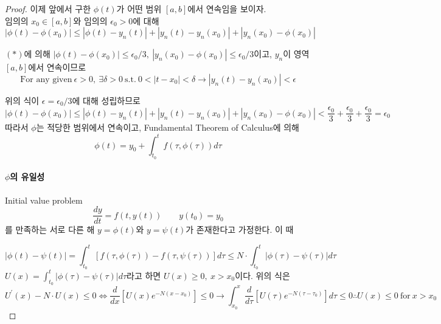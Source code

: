 \documentclass[a4paper,10pt]{article}
\begin{document}
\begin{proof}
이제 앞에서 구한 $\phi(t)$가 어떤 범위 $[a, b]$에서 연속임을 보이자.\\

임의의 $x_0 \in [a, b]$와 임의의 $\epsilon_0 > 0$에 대해
\begin{displaymath}
  \left| \phi(t) - \phi(x_0) \right| \leq \left| \phi(t) - y_n(t) \right| + \left| y_n(t) - y_n(x_0) \right| + \left| y_n(x_0) - \phi(x_0) \right|
\end{displaymath}

$(\ast)$에 의해 $ \left| \phi(t) - \phi(x_0) \right| \leq \epsilon_0 / 3, \ \left| y_n(x_0) - \phi(x_0) \right| \leq \epsilon_0 / 3$이고, $y_n$이 영역 $[a,b]$에서 연속이므로
\begin{displaymath}
  \text{For any given}\  \epsilon > 0,\ \exists \delta > 0 \ \text{s.t.} \ 0 < |t - x_0| < \delta \longrightarrow |y_n(t) - y_n(x_0)| < \epsilon 
\end{displaymath}

위의 식이 $\epsilon = \epsilon_0 / 3$에 대해 성립하므로
\begin{displaymath}
  \left| \phi(t) - \phi(x_0) \right| \leq \left| \phi(t) - y_n(t) \right| + \left| y_n(t) - y_n(x_0) \right| + \left| y_n(x_0) - \phi(x_0) \right| < \frac{\epsilon_0}{3} + \frac{\epsilon_0}{3} + \frac{\epsilon_0}{3} = \epsilon_0
\end{displaymath}
따라서 $\phi$는 적당한 범위에서 연속이고, Fundamental Theorem of Calculus에 의해 
\begin{displaymath}
  \phi(t) = y_0 + \int_{t_0}^{t}f(\tau, \phi(\tau)) d \tau
\end{displaymath}

\paragraph{$\phi$의 유일성}
Initial value problem
\begin{displaymath}
    \frac{dy}{dt} = f(t, y(t)) \qquad y(t_0) = y_0
\end{displaymath}
를 만족하는 서로 다른 해 $y = \phi(t)$와 $y = \psi(t)$가 존재한다고 가정한다. 이 때 %

\begin{displaymath}
    |\phi(t) - \psi(t)| = \int_{t_0}^{t} [ f(\tau, \phi(\tau)) - f(\tau, \psi(\tau))] d \tau \leq N \cdot \int_{t_0}^{t}|\phi(\tau) - \psi(\tau)| d\tau
\end{displaymath}
$\displaystyle{U(x) = \int_{t_0}^{t}|\phi(\tau) - \psi(\tau)| d\tau}$라고 하면 $U(x) \geq 0, \ x > x_0$이다.
위의 식은
\begin{displaymath}
    U^{\prime}(x) - N\cdot U(x) \leq 0 \iff \frac{d}{dx} \left[ U(x) e^{-N(x-x_0)}\right] \leq 0 \longrightarrow \int_{x_0}^{x} \frac{d}{d \tau} \left[ U(\tau) e^{-N(\tau-\tau_0)}\right] d \tau \leq 0
    \therefore U(x) \leq 0 \ \text{for} \ x > x_0
\end{displaymath}
 

\end{proof}
\end{document}
